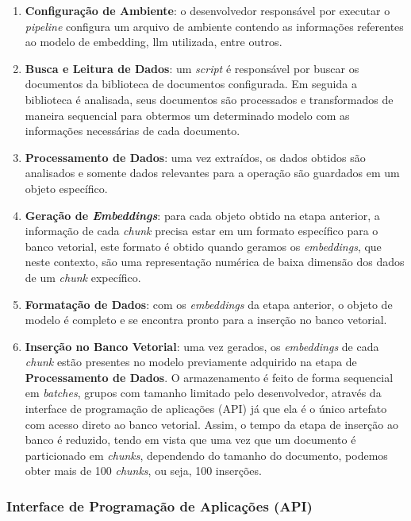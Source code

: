 \documentclass[a4paper, 12pt]{article}
\begin{document}
    \begin{enumerate}
        \item \textbf{Configuração de Ambiente}: o desenvolvedor responsável por executar o \textit{pipeline} configura um arquivo de ambiente contendo as informações referentes ao modelo de embedding, llm utilizada, entre outros.
        \item \textbf{Busca e Leitura de Dados}: um \textit{script} é responsável por buscar os documentos da biblioteca de documentos configurada. Em seguida a biblioteca é analisada, seus documentos são processados e transformados de maneira sequencial para obtermos um determinado modelo com as informações necessárias de cada documento.
        \item \textbf{Processamento de Dados}: uma vez extraídos, os dados obtidos são analisados e somente dados relevantes para a operação são guardados em um objeto específico.
        \item \textbf{Geração de \textit{Embeddings}}: para cada objeto obtido na etapa anterior, a informação de cada \textit{chunk} precisa estar em um formato específico para o banco vetorial, este formato é obtido quando geramos os \textit{embeddings}, que neste contexto, são uma representação numérica de baixa dimensão dos dados de um \textit{chunk} expecífico.
        \item \textbf{Formatação de Dados}: com os \textit{embeddings} da etapa anterior, o objeto de modelo é completo e se encontra pronto para a inserção no banco vetorial.
        \item \textbf{Inserção no Banco Vetorial}: uma vez gerados, os \textit{embeddings} de cada \textit{chunk} estão presentes no modelo previamente adquirido na etapa de \textbf{Processamento de Dados}. O armazenamento é feito de forma sequencial em \textit{batches}, grupos com tamanho limitado pelo desenvolvedor, através da interface de programação de aplicações (API) já que ela é o único artefato com acesso direto ao banco vetorial. Assim, o tempo da etapa de inserção ao banco é reduzido, tendo em vista que uma vez que um documento é particionado em \textit{chunks}, dependendo do tamanho do documento, podemos obter mais de 100 \textit{chunks}, ou seja, 100 inserções.
    \end{enumerate}
    
    \subsubsection{Interface de Programação de Aplicações (API)} \label{sec:api_concept}
\end{document}
